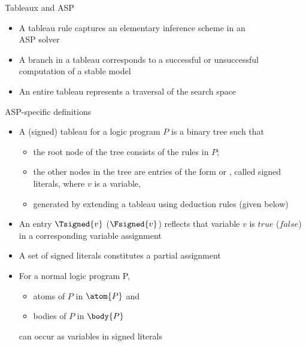 \begin{frame}{Tableaux and ASP}
  \bigskip
  \begin{itemize}
  \item<1-> A tableau rule captures an elementary inference scheme in an\\ ASP solver
    \smallskip
  \item<2-> A \alert{branch} in a tableau corresponds to a successful or unsuccessful
    \alert{computation} of a stable model
    \smallskip
  \item<3-> An \alert{entire tableau} represents a traversal of the \alert{search space}
  \end{itemize}
\end{frame}
\begin{frame}{ASP-specific definitions}
  \begin{itemize}
  \item<1-> A (signed) \alert{tableau} for a logic program $P$ is a binary tree such that
    \begin{itemize}
    \item the root node of the tree consists of the rules in $P$;
    \item the other nodes in the tree are \alert{entries} of the form 
      or , called \alert{signed literals}, where $v$ is a variable,
    \item generated by extending a tableau using deduction rules (given below)
    \end{itemize}
    \smallskip
  \item<2-> An entry $\Tsigned{v}$ ($\Fsigned{v}$) reflects that variable $v$ is
    $\mathit{true}$ ($\mathit{false}$) in a corresponding variable assignment
  \item<2->[] A set of signed literals constitutes a partial assignment
    \smallskip
  \item<3-> For a normal logic program P,
    \begin{itemize}
    \item atoms of $P$ in $\atom{P}$ and
    \item bodies of $P$ in $\body{P}$ %
    \end{itemize}
    can occur as variables in signed literals
  \end{itemize}
\end{frame}

